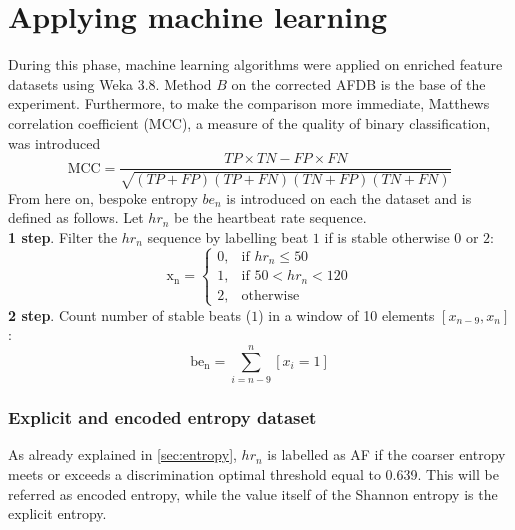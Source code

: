 \section{Applying machine learning}
During this phase, machine learning algorithms were applied on enriched feature datasets using Weka 3.8. Method $B$  on the corrected AFDB is the base of the experiment. Furthermore, to make the comparison more immediate, Matthews correlation coefficient (MCC), a measure of the quality of binary classification, was introduced
\begin{equation}
\mathrm{MCC}=\frac{TP \times TN-FP \times FN}{\sqrt{(TP+FP)(TP+FN)(TN+FP)(TN+FN)}}
\end{equation}
From here on, bespoke entropy $be_n$ is introduced on each the dataset and is defined as follows. Let $hr_n$ be the heartbeat rate sequence. \\
\textbf{1 step}. Filter the $hr_n$ sequence by labelling beat $1$ if is stable otherwise $0$ or $2$:\\
\begin{equation}
\mathrm{x_n} = \begin{cases}
	0, & \text{if } hr_n \le 50 \\
	1, & \text{if } 50 < hr_n < 120 \\
    2,              & \text{otherwise} 
\end{cases}
\end{equation}
\textbf{2 step}. Count number of stable beats ($1$) in a window of 10 elements $[x_{n-9}, x_{n}]$:\\
\begin{equation}
\mathrm{be_n} = \sum_{i=n-9}^{n} [x_i=1]
\end{equation}

\subsubsection{Explicit and encoded entropy dataset}
As already explained in \ref{sec:entropy}, $hr_n$ is labelled as AF if the coarser entropy meets or exceeds a discrimination optimal threshold equal to 0.639. This will be referred as encoded entropy, while the value itself of the Shannon entropy is the explicit entropy. 

